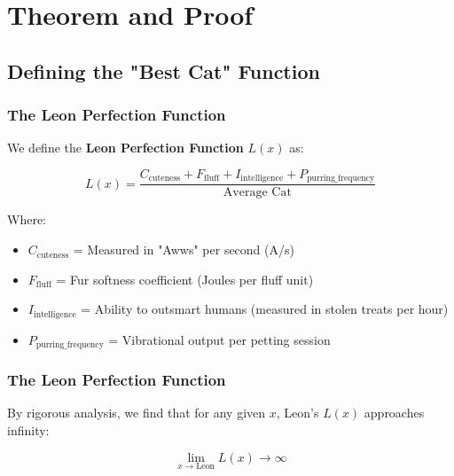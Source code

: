 \documentclass[compress]{beamer}
\begin{document}
\section{Theorem and Proof}

\subsection{Defining the "Best Cat" Function}
\begin{frame}
\frametitle{The Leon Perfection Function}
We define the \textbf{Leon Perfection Function} \( L(x) \) as:

\begin{equation}
L(x) = \frac{C_{\text{cuteness}} + F_{\text{fluff}} + I_{\text{intelligence}} + P_{\text{purring\_frequency}}}{\text{Average Cat}}
\end{equation}

Where:
\begin{itemize}
    \item \( C_{\text{cuteness}} \) = Measured in "Awws" per second (A/s)
    \item \( F_{\text{fluff}} \) = Fur softness coefficient (Joules per fluff unit)
    \item \( I_{\text{intelligence}} \) = Ability to outsmart humans (measured in stolen treats per hour)
    \item \( P_{\text{purring\_frequency}} \) = Vibrational output per petting session
\end{itemize}
\end{frame}

\begin{frame}
\frametitle{The Leon Perfection Function}
By rigorous analysis, we find that for any given \( x \), Leon's \( L(x) \) approaches infinity:

\begin{equation}
\lim_{x \to \text{Leon}} L(x) \to \infty
\end{equation}
\end{frame}
\end{document}
